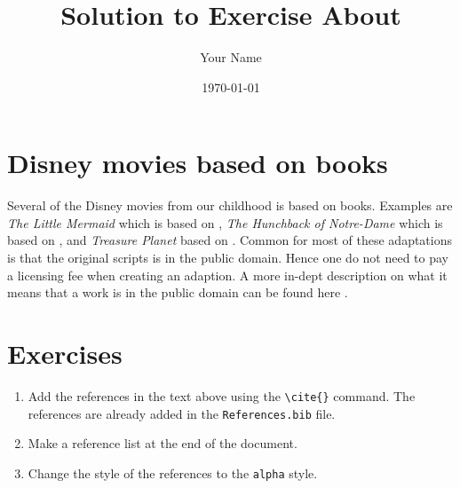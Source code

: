 \documentclass{article}
\title{Solution to Exercise About \BibTeX{}}
\author{Your Name}
\date{\today}
\begin{document}
\maketitle
\section{Disney movies based on books}

Several of the Disney movies from our childhood is based on books. Examples are \textit{The Little Mermaid} which is based on \cite{andersen1964little}, \textit{The Hunchback of Notre-Dame} which is based on \cite{hugo2012hunchback}, and \textit{Treasure Planet} based on \cite{stevenson1883sea}. Common for most of these adaptations is that the original scripts is in the public domain. Hence one do not need to pay a licensing fee when creating an adaption. A more in-dept description on what it means that a work is in the public domain can be found here \cite{wiki:xxx}.

\section{Exercises}
\begin{enumerate}
    \item Add the references in the text above using the \verb+\cite{}+ command. The references are already added in the \texttt{References.bib} file.
    \item Make a reference list at the end of the document.
    \item Change the style of the references to the \texttt{alpha} style.
\end{enumerate}

\end{document}
